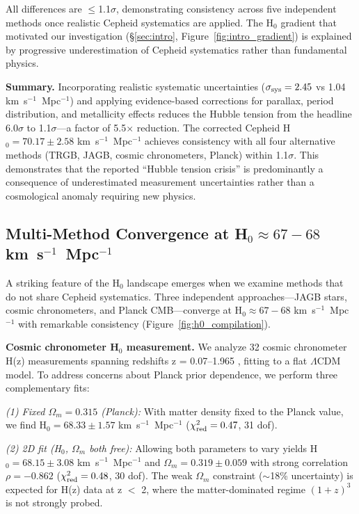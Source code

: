 \documentclass[twocolumn, linenumbers]{aastex701}
\begin{document}
All differences are $\leq$1.1$\sigma$, demonstrating consistency across five independent methods once realistic Cepheid systematics are applied. The H$_0$ gradient that motivated our investigation (\S\ref{sec:intro}, Figure~\ref{fig:intro_gradient}) is explained by progressive underestimation of Cepheid systematics rather than fundamental physics.

\textbf{Summary.} Incorporating realistic systematic uncertainties ($\sigma_{\rm sys} = 2.45$ vs 1.04 km~s$^{-1}$~Mpc$^{-1}$) and applying evidence-based corrections for parallax, period distribution, and metallicity effects reduces the Hubble tension from the headline 6.0$\sigma$ to 1.1$\sigma$---a factor of 5.5$\times$ reduction. The corrected Cepheid H$_0 = 70.17 \pm 2.58$ km~s$^{-1}$~Mpc$^{-1}$ achieves consistency with all four alternative methods (TRGB, JAGB, cosmic chronometers, Planck) within 1.1$\sigma$. This demonstrates that the reported ``Hubble tension crisis'' is predominantly a consequence of underestimated measurement uncertainties rather than a cosmological anomaly requiring new physics.

\subsection{Multi-Method Convergence at H$_0 \approx 67-68$ km~s$^{-1}$~Mpc$^{-1}$}
\label{sec:results_convergence}

A striking feature of the H$_0$ landscape emerges when we examine methods that do not share Cepheid systematics. Three independent approaches---JAGB stars, cosmic chronometers, and Planck CMB---converge at H$_0 \approx 67-68$ km~s$^{-1}$~Mpc$^{-1}$ with remarkable consistency (Figure~\ref{fig:h0_compilation}).

\textbf{Cosmic chronometer H$_0$ measurement.} We analyze 32 cosmic chronometer H(z) measurements spanning redshifts z = 0.07--1.965 \citep{Moresco2022}, fitting to a flat $\Lambda$CDM model. To address concerns about Planck prior dependence, we perform three complementary fits:

\textit{(1) Fixed $\Omega_m = 0.315$ (Planck):} With matter density fixed to the Planck value, we find H$_0 = 68.33 \pm 1.57$ km~s$^{-1}$~Mpc$^{-1}$ ($\chi^2_{\rm red} = 0.47$, 31 dof).

\textit{(2) 2D fit (H$_0$, $\Omega_m$ both free):} Allowing both parameters to vary yields H$_0 = 68.15 \pm 3.08$ km~s$^{-1}$~Mpc$^{-1}$ and $\Omega_m = 0.319 \pm 0.059$ with strong correlation $\rho = -0.862$ ($\chi^2_{\rm red} = 0.48$, 30 dof). The weak $\Omega_m$ constraint ($\sim$18\% uncertainty) is expected for H(z) data at z $<$ 2, where the matter-dominated regime $(1+z)^3$ is not strongly probed.
\end{document}
